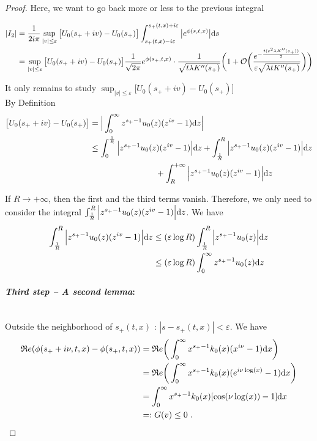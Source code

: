 \documentclass[11pt]{amsart}
\renewcommand{\Re}{\mathfrak{R}e}
\begin{document}
\begin{proof}
Here, we want to go back more or less to the previous integral

    \begin{align*}
         |I_2| 
         &= 
         \frac{1}{2i \pi} \sup_{|v| \leq \varepsilon} \big[U_0(s_+ + iv) -  U_0(s_+) \big] \int_{s_+(t,x) - i\varepsilon}^{s_+(t,x) + i\varepsilon} \big| e^{\phi(s,t,x)} \big| \mathrm ds \\
         &=
         \sup_{|v| \leq \varepsilon} \big[U_0(s_+ + iv) -  U_0(s_+) \big] \frac{1}{\sqrt{2\pi}} e^{\phi(s_+, t, x)} \cdot \frac{1}{\sqrt{t \lambda K''(s_+)}} \bigg( 
    1 + \mathcal{O}\bigg(\frac{e^{-\frac{t(\varepsilon^2 \lambda K''(s_+))}{2}} }{\varepsilon \sqrt{\lambda tK''(s_+)}}\bigg) \bigg)
    \end{align*}
    
It only remains to study $  \sup_{|v| \leq \varepsilon} \big[U_0(s_+ + iv) -  U_0(s_+) \big]$ \\

By Definition
\begin{align*}
    \big[U_0(s_+ + iv) -  U_0(s_+) \big]
    &= \Big| \int_0^\infty  z^{s_+ - 1}u_0(z) (z^{iv} - 1) \mathrm dz \Big| \\
    &\leq \int_0^{\frac{1}{R}} \Big|  z^{s_+ - 1}u_0(z) (z^{iv} - 1) \Big| \mathrm dz
        + \int_{\frac{1}{R}}^R \Big|  z^{s_+ - 1}u_0(z) (z^{iv} - 1) \Big| \mathrm dz \\
        &\qquad \qquad \qquad \qquad
        + \int_R^{+\infty} \Big|  z^{s_+ - 1}u_0(z) (z^{iv} - 1) \Big| \mathrm dz \\
\end{align*}

If $R \to + \infty$, then the first and the third terms vanish. Therefore, we only need to consider the integral $ \int_{\frac{1}{R}}^R \Big|  z^{s_+ - 1}u_0(z) (z^{iv} - 1) \Big| \mathrm dz$. We have
    \begin{align*}
         \int_{\frac{1}{R}}^R \Big|  z^{s_+ - 1}u_0(z) (z^{iv} - 1) \Big| \mathrm dz 
         &\leq 
          (\varepsilon \log R)\int_{\frac{1}{R}}^R \Big|  z^{s_+ - 1}u_0(z) \Big| \mathrm dz \\
         &\leq 
          (\varepsilon \log R)\int_{0}^{\infty} z^{s_+ - 1}u_0(z)  \mathrm dz \\
    \end{align*}

\medskip
\paragraph{\textit{Third step -- A second lemma}:}\mbox{}\\
Outside the neighborhood of $s_+(t,x)$ : $|s - s_+(t,x)| < \varepsilon$. We have
\begin{align*}
    \Re(\phi(s_+ + i \nu, t, x) - \phi(s_+, t, x)) 
    &=
    \Re \bigg( \int_0^\infty x^{s_+ - 1}k_0(x) (x^{i\nu} - 1) \dx \bigg) \\
    &=
    \Re \bigg( \int_0^\infty x^{s_+ - 1}k_0(x) (e^{i\nu \log(x)}- 1) \dx \bigg) \\ 
    &= 
    \int_0^\infty x^{s_+ - 1}k_0(x) [\cos(\nu \log(x))- 1] \dx  \\
    &=: G(v) \leq 0
    \eqfinp
\end{align*}


\end{proof}
\end{document}
